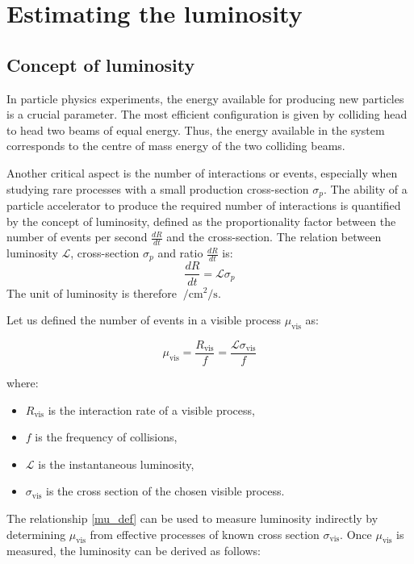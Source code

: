 \chapter{Estimating the luminosity}\label{chap:luminosity}

\section{Concept of luminosity}
In particle physics experiments, the energy available for producing new particles is a crucial parameter. The most efficient configuration is given by colliding head to head two beams of equal energy. Thus, the energy available in the system corresponds to the centre of mass energy of the two colliding beams.

Another critical aspect is the number of interactions or events, especially when studying rare processes with a small production cross-section $\sigma_p$. The ability of a particle accelerator to produce the required number of interactions is quantified by the concept of luminosity, defined as the proportionality factor between the number of events per second $\tfrac{dR}{dt}$ and the cross-section. The relation between luminosity $\mathcal{L}$, cross-section $\sigma_p$ and ratio $\tfrac{dR}{dt}$ is:
\begin{equation}
    \frac{dR}{dt} = \mathcal{L}{\sigma_p}\label{lumi_def}
\end{equation}
The unit of luminosity is therefore $\SI{}{\per\centi\meter\squared\per\second}$.
 
Let us defined the number of events in a visible process $\mu_{\text{vis}}$ as:

\begin{equation}
\mu_{\text{vis}} = \frac{R_{\text{vis}}}{f} = \frac{\mathcal{L} \sigma_{\text{vis}}}{f}\label{mu_def}
\end{equation}

where:
\begin{itemize}
\item  $R_{\text{vis}}$ is the interaction rate of a visible process,
\item  $f$ is the frequency of collisions,
\item  $\mathcal{L}$ is the instantaneous luminosity,
\item  $\sigma_{\text{vis}}$ is the cross section of the chosen visible process.
\end{itemize}
The relationship \eqref{mu_def} can be used to measure luminosity indirectly by determining $\mu_{\text{vis}}$ from effective processes of known cross section $\sigma_\text{vis}$.
Once $\mu_{\text{vis}}$ is measured, the luminosity can be derived as follows:

